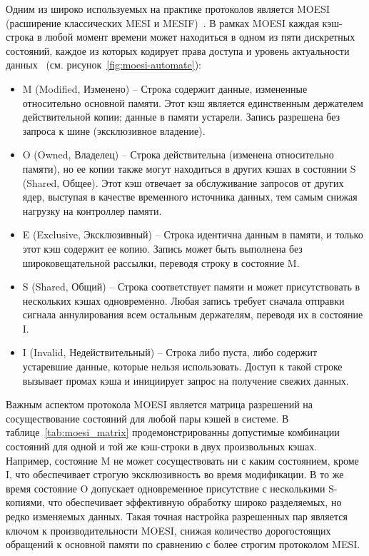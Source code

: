 Одним из широко используемых на практике протоколов является MOESI
(расширение классических MESI и MESIF)~\cite{MOESI,mesi,mesif}.
В рамках MOESI каждая кэш-строка в любой момент времени может
находиться в одном из пяти дискретных состояний, каждое из которых
кодирует права доступа и уровень актуальности данных~\cite{MOESIAUTO}
(см. рисунок~\ref{fig:moesi-automate}):

\begin{itemize}
  \item M (Modified, Изменено) -- Строка содержит данные, измененные
    относительно основной памяти. Этот кэш является единственным
    держателем действительной копии; данные в памяти устарели. Запись
    разрешена без запроса к шине (эксклюзивное владение).
  \item O (Owned, Владелец) -- Строка действительна (изменена
    относительно памяти), но ее копии также могут находиться в других
    кэшах в состоянии S (Shared, Общее). Этот кэш отвечает за
    обслуживание запросов от других ядер, выступая в качестве
    временного источника данных, тем самым снижая нагрузку на контроллер памяти.
  \item E (Exclusive, Эксклюзивный) -- Строка идентична данным в
    памяти, и только этот кэш содержит ее копию. Запись может быть
    выполнена без широковещательной рассылки, переводя строку в состояние M.
  \item S (Shared, Общий) -- Строка соответствует памяти и может
    присутствовать в нескольких кэшах одновременно. Любая запись
    требует сначала отправки сигнала аннулирования всем остальным
    держателям, переводя их в состояние I.
  \item I (Invalid, Недействительный) -- Строка либо пуста, либо
    содержит устаревшие данные, которые нельзя использовать. Доступ к
    такой строке вызывает промах кэша и инициирует запрос на
    получение свежих данных.
\end{itemize}

Важным аспектом протокола MOESI является матрица
разрешений на сосуществование состояний для любой пары кэшей в системе.
В таблице~\ref{tab:moesi_matrix} продемонстрированны допустимые
комбинации состояний для одной и той же кэш-строки в двух произвольных кэшах.
Например, состояние M не может сосуществовать ни с каким состоянием,
кроме I, что обеспечивает строгую эксклюзивность во время модификации.
В то же время состояние O допускает одновременное присутствие с
несколькими S-копиями, что обеспечивает эффективную обработку широко
разделяемых, но редко изменяемых данных.
Такая точная настройка разрешенных пар является ключом к
производительности MOESI, снижая количество дорогостоящих обращений к
основной памяти по сравнению с более строгим протоколом MESI.

